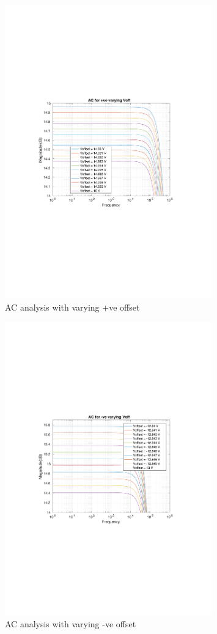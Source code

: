 \documentclass[12pt,a4paper,UKenglish]{article}
\begin{document}
\begin{figure} [H]
  \centering 
  \includegraphics[width=0.8\textwidth]{img/1c_pos_offset.pdf} 
  \caption{AC analysis with varying +ve offset}
  \label{ac_pos} 
\end{figure}

\begin{figure} [H]
  \centering 
  \includegraphics[width=0.8\textwidth]{img/1c_neg_offset.pdf} 
  \caption{AC analysis with varying -ve offset}
  \label{ac_neg} 
\end{figure}
\end{document}
